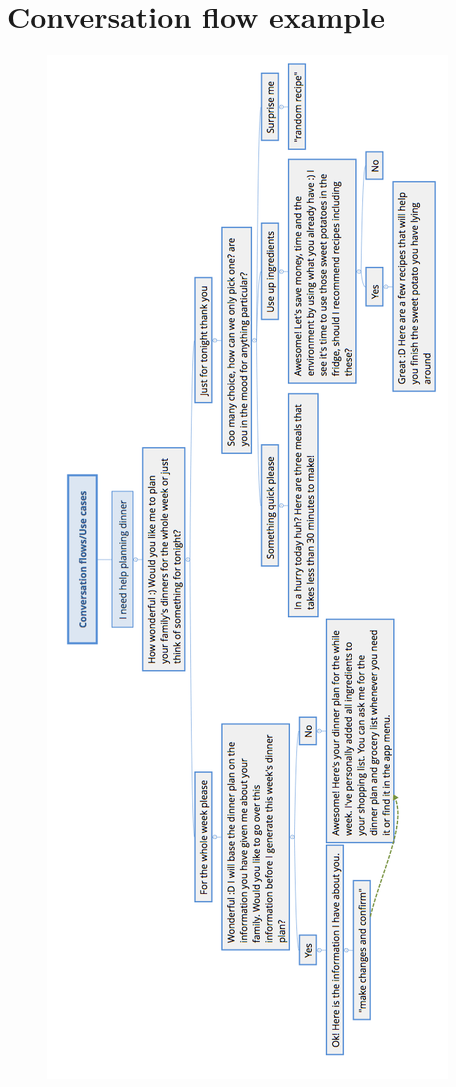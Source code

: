 \section{Conversation flow example}
    \label{converflow}
     \begin{figure}[H]
        \centering
        \includegraphics[scale=0.4]{figures/convflow.png}
    \end{figure}
    
